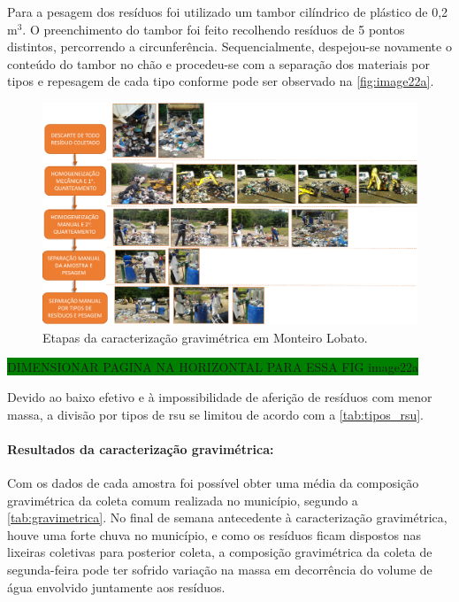 	Para a pesagem dos resíduos foi utilizado um tambor cilíndrico de plástico de 0,2 m$^{3}$. O preenchimento do tambor foi feito recolhendo resíduos de 5 pontos distintos, percorrendo a circunferência. Sequencialmente, despejou-se novamente o conteúdo do tambor no chão e procedeu-se com a separação dos materiais por tipos e repesagem de cada tipo conforme pode ser observado na \autoref{fig:image22a}.
	
	\begin{figure}
		\centering
		\includegraphics[width=0.7\linewidth]{produtos/prodtres/image22a}
		\caption{Etapas da caracterização gravimétrica em Monteiro Lobato.}
		\label{fig:image22a}
	\end{figure}

	\colorbox{green}{DIMENSIONAR PAGINA NA HORIZONTAL PARA ESSA FIG image22a}
	
	Devido ao baixo efetivo e à impossibilidade de aferição de resíduos com menor massa, a divisão por tipos de \gls{rsu} se limitou de acordo com a \autoref{tab:tipos_rsu}.
	
		
	
	
	\paragraph{\textbf{Resultados da caracterização gravimétrica:}}
	
	Com os dados de cada amostra foi possível obter uma média da composição gravimétrica da coleta comum realizada no município, segundo a \autoref{tab:gravimetrica}. No final de semana antecedente à caracterização gravimétrica, houve uma forte chuva no município, e como os resíduos ficam dispostos nas lixeiras coletivas para posterior coleta, a composição gravimétrica da coleta de segunda-feira pode ter sofrido variação na massa em decorrência do volume de água envolvido juntamente aos resíduos.
	
	
	
